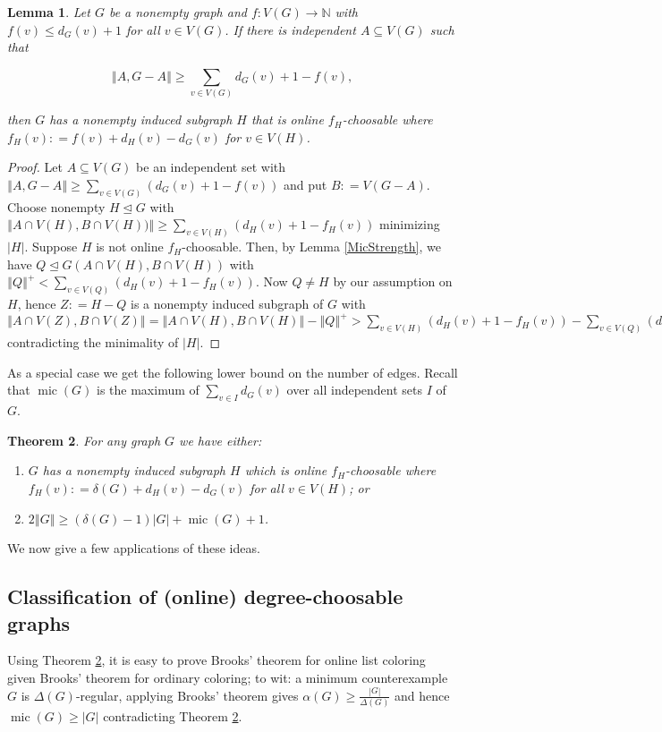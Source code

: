 \documentclass[12pt]{article}
\theoremstyle{plain}
\newtheorem{thm}{Theorem}[section]
\newtheorem{lem}[thm]{Lemma}
\theoremstyle{definition}
\theoremstyle{remark}
\newcommand{\IN}{\mathbb{N}}
\newcommand{\card}[1]{\left|#1\right|}
\newcommand{\size}[1]{\left\Vert#1\right\Vert}
\newcommand{\func}[3]{#1\colon #2 \rightarrow #3}
\newcommand{\parens}[1]{\left( #1 \right)}
\newcommand{\DefinedAs}{\mathrel{\mathop:}=}
\newcommand{\mic}{\operatorname{mic}}
\begin{document}
\begin{lem}\label{SecondStrengtheningMic}
Let $G$ be a nonempty graph and $\func{f}{V(G)}{\IN}$ with $f(v) \leq d_G(v) + 1$ for all $v \in V(G)$. If there is independent $A \subseteq V(G)$ such that

\[\size{A, G-A} \ge  \sum_{v \in V(G)} d_G(v) + 1 - f(v),\]

\noindent then $G$ has a nonempty induced subgraph $H$ that is online $f_H$-choosable where $f_H(v) \DefinedAs f(v) + d_H(v) - d_G(v)$ for $v \in V(H)$.
\end{lem}
\begin{proof}
Let $A \subseteq V(G)$ be an independent set with $\size{A, G-A} \geq \sum_{v \in V(G)} \parens{d_G(v) + 1 - f(v)}$ and put $B \DefinedAs V(G-A)$. Choose nonempty $H \unlhd G$ with $\size{A \cap V(H), B \cap V(H))} \geq  \sum_{v \in V(H)} \parens{d_H(v) + 1 - f_H(v)}$ minimizing $\card{H}$. Suppose $H$ is not online $f_H$-choosable. Then, by Lemma \ref{MicStrength}, we have $Q \unlhd G(A \cap V(H), B \cap V(H))$ with $\size{Q}^+ < \sum_{v \in V(Q)} \parens{d_H(v) + 1 - f_H(v)}$.  Now $Q \neq H$ by our assumption on $H$, hence $Z \DefinedAs H-Q$ is a nonempty induced subgraph of $G$ with $\size{A \cap V(Z), B \cap V(Z)} = \size{A \cap V(H), B \cap V(H)} - \size{Q}^+ > \sum_{v \in V(H)} \parens{d_H(v) + 1 - f_H(v)} - \sum_{v \in V(Q)} \parens{d_H(v) + 1 - f_H(v)} = \sum_{v \in V(Z)} \parens{d_Z(v) + 1 - f_Z(v)}$ contradicting the minimality of $\card{H}$.
\end{proof}

As a special case we get the following lower bound on the number of edges.  Recall that $\mic(G)$ is the maximum of $\sum_{v \in I} d_G(v)$ over all independent sets $I$ of $G$.

\begin{thm}\label{ConsantListMicStrength}
For any graph $G$ we have either:
\begin{enumerate}
\item $G$ has a nonempty induced subgraph $H$ which is online $f_H$-choosable where $f_H(v) \DefinedAs \delta(G) + d_H(v) - d_G(v)$ for all $v \in V(H)$; or
\item $2\size{G} \geq (\delta(G) - 1)\card{G} + \mic(G) + 1$.
\end{enumerate}
\end{thm}

\noindent We now give a few applications of these ideas.

\subsection{Classification of (online) degree-choosable graphs}
Using Theorem \ref{ConsantListMicStrength}, it is easy to prove Brooks' theorem for online list coloring given Brooks' theorem for ordinary coloring; to wit: a minimum counterexample $G$ is $\Delta(G)$-regular, applying Brooks' theorem gives $\alpha(G) \ge \frac{|G|}{\Delta(G)}$ and hence $\mic(G) \ge |G|$ contradicting Theorem \ref{ConsantListMicStrength}.
\end{document}
